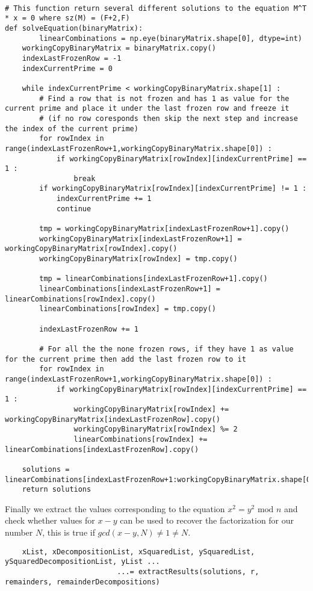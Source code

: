 \documentclass{article}
\begin{document}
\begin{verbatim}

# This function return several different solutions to the equation M^T * x = 0 where sz(M) = (F+2,F)
def solveEquation(binaryMatrix):
    	linearCombinations = np.eye(binaryMatrix.shape[0], dtype=int)
	workingCopyBinaryMatrix = binaryMatrix.copy()
	indexLastFrozenRow = -1
	indexCurrentPrime = 0

	while indexCurrentPrime < workingCopyBinaryMatrix.shape[1] :
		# Find a row that is not frozen and has 1 as value for the current prime and place it under the last frozen row and freeze it
		# (if no row coresponds then skip the next step and increase the index of the current prime)
		for rowIndex in range(indexLastFrozenRow+1,workingCopyBinaryMatrix.shape[0]) :
			if workingCopyBinaryMatrix[rowIndex][indexCurrentPrime] == 1 :
				break
		if workingCopyBinaryMatrix[rowIndex][indexCurrentPrime] != 1 :
			indexCurrentPrime += 1
			continue

		tmp = workingCopyBinaryMatrix[indexLastFrozenRow+1].copy()
		workingCopyBinaryMatrix[indexLastFrozenRow+1] = workingCopyBinaryMatrix[rowIndex].copy()
		workingCopyBinaryMatrix[rowIndex] = tmp.copy()

		tmp = linearCombinations[indexLastFrozenRow+1].copy()
		linearCombinations[indexLastFrozenRow+1] = linearCombinations[rowIndex].copy()
		linearCombinations[rowIndex] = tmp.copy()

		indexLastFrozenRow += 1

		# For all the the none frozen rows, if they have 1 as value for the current prime then add the last frozen row to it
		for rowIndex in range(indexLastFrozenRow+1,workingCopyBinaryMatrix.shape[0]) :
			if workingCopyBinaryMatrix[rowIndex][indexCurrentPrime] == 1 :
				workingCopyBinaryMatrix[rowIndex] += workingCopyBinaryMatrix[indexLastFrozenRow].copy()
				workingCopyBinaryMatrix[rowIndex] %= 2
				linearCombinations[rowIndex] += linearCombinations[indexLastFrozenRow].copy()

	solutions = linearCombinations[indexLastFrozenRow+1:workingCopyBinaryMatrix.shape[0]]%2
	return solutions
\end{verbatim}

Finally we extract the values corresponding to the equation $x^2 = y^2 \text{ mod } n$ and check whether values for $x-y$ can be used to recover the factorization for our number $N$, this is true if $gcd(x-y,N) \neq 1 \neq N$.

\begin{verbatim}
    xList, xDecompositionList, xSquaredList, ySquaredList, ySquaredDecompositionList, yList ...
                          ...= extractResults(solutions, r, remainders, remainderDecompositions)
\end{verbatim}
\end{document}
